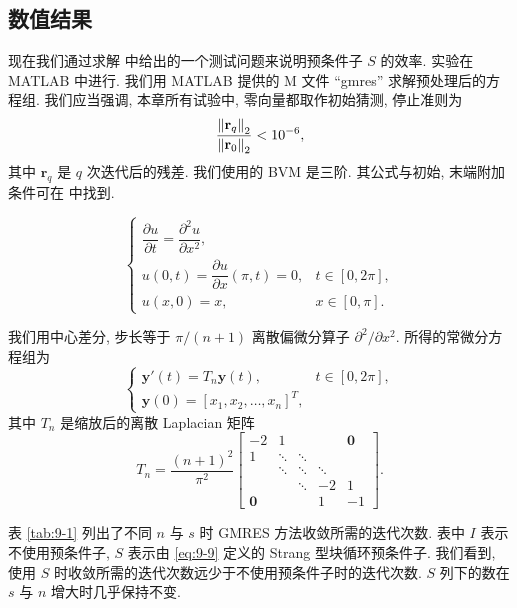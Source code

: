 \subsection{数值结果}
\label{sec:9-3-3}

现在我们通过求解 \cite{src:8} 中给出的一个测试问题来说明预条件子 $S$ 的效率. 实验在 MATLAB 中进行. 我们用 MATLAB 提供的 M 文件 ``gmres'' 求解预处理后的方程组. 我们应当强调, 本章所有试验中, 零向量都取作初始猜测, 停止准则为
\[
  \frac{\left\|\mathbf{r}_q\right\|_2}{\left\|\mathbf{r}_0\right\|_2}<10^{-6},
\]
其中 $\mathbf{r}_q$ 是 $q$ 次迭代后的残差. 我们使用的 BVM 是三阶. 其公式与初始, 末端附加条件可在 \cite{src:10} 中找到.

\begin{example}[热传导方程]
\label{ex:9-1}
\[
  \left\{
  \begin{array}{ll}
    \dfrac{\partial u}{\partial t}=\dfrac{\partial^2u}{\partial x^2}, & \\[2ex]
    u(0,t)=\dfrac{\partial u}{\partial x}(\pi,t)=0, & t\in[0,2\pi],\\[1ex]
    u(x,0)=x, & x\in[0,\pi].
  \end{array}
  \right.
\]
\end{example}

我们用中心差分, 步长等于 $\pi/(n+1)$ 离散偏微分算子 $\partial^2/\partial x^2$. 所得的常微分方程组为
\[
  \left\{
  \begin{array}{ll}
    \mathbf{y}'(t)=T_n\mathbf{y}(t), & t\in[0,2\pi],\\
    \mathbf{y}(0)=[x_1,x_2,\ldots,x_n]^T,
  \end{array}
  \right.
\]
其中 $T_n$ 是缩放后的离散 Laplacian 矩阵
\[
  T_n=\frac{(n+1)^2}{\pi^2}\begin{bmatrix}
    -2 & 1 & & & \mathbf{0}\\
    1 & \ddots & \ddots & & \\
    & \ddots & \ddots & \ddots & \\
    & & \ddots & -2 & 1\\
    \mathbf{0} & & & 1 & -1
  \end{bmatrix}.
\]

表 \ref{tab:9-1} 列出了不同 $n$ 与 $s$ 时 GMRES 方法收敛所需的迭代次数. 表中 $I$ 表示不使用预条件子, $S$ 表示由 \eqref{eq:9-9} 定义的 Strang 型块循环预条件子. 我们看到, 使用 $S$ 时收敛所需的迭代次数远少于不使用预条件子时的迭代次数. $S$ 列下的数在 $s$ 与 $n$ 增大时几乎保持不变.

